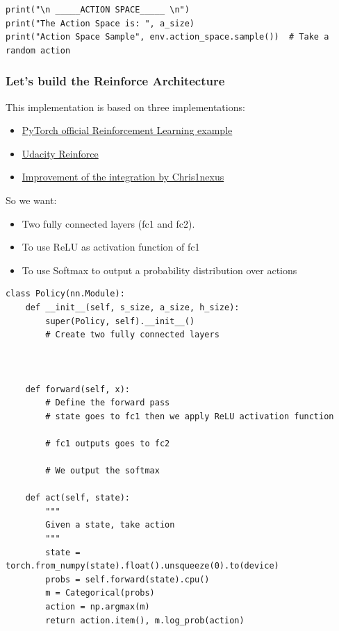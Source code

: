 \documentclass[11pt,a4paper]{article}
\begin{document}
\begin{lstlisting}
print("\n _____ACTION SPACE_____ \n")
print("The Action Space is: ", a_size)
print("Action Space Sample", env.action_space.sample())  # Take a random action
\end{lstlisting}

\subsubsection{Let's build the Reinforce Architecture}\label{lets-build-the-reinforce-architecture}

This implementation is based on three implementations:

\begin{itemize}
\tightlist
\item
  \href{https://github.com/pytorch/examples/blob/main/reinforcement_learning/reinforce.py}{PyTorch official Reinforcement Learning example}
\item
  \href{https://github.com/udacity/deep-reinforcement-learning/blob/master/reinforce/REINFORCE.ipynb}{Udacity Reinforce}
\item
  \href{https://github.com/huggingface/deep-rl-class/pull/95}{Improvement of the integration by Chris1nexus}
\end{itemize}


So we want:

\begin{itemize}
\tightlist
\item
  Two fully connected layers (fc1 and fc2).
\item
  To use ReLU as activation function of fc1
\item
  To use Softmax to output a probability distribution over actions
\end{itemize}

\begin{lstlisting}
class Policy(nn.Module):
    def __init__(self, s_size, a_size, h_size):
        super(Policy, self).__init__()
        # Create two fully connected layers



    def forward(self, x):
        # Define the forward pass
        # state goes to fc1 then we apply ReLU activation function

        # fc1 outputs goes to fc2

        # We output the softmax

    def act(self, state):
        """
        Given a state, take action
        """
        state = torch.from_numpy(state).float().unsqueeze(0).to(device)
        probs = self.forward(state).cpu()
        m = Categorical(probs)
        action = np.argmax(m)
        return action.item(), m.log_prob(action)
\end{lstlisting}
\end{document}

